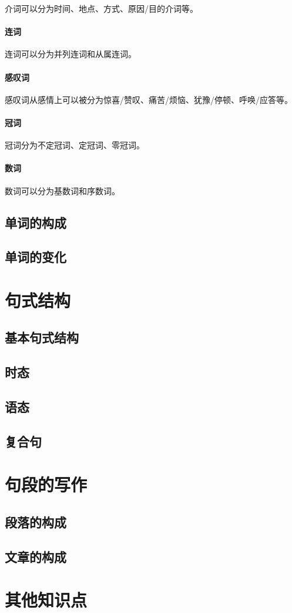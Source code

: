 \documentclass[UTF8]{ctexbook}
\begin{document}
介词可以分为时间、地点、方式、原因/目的介词等。

\subsection{连词}

连词可以分为并列连词和从属连词。

\subsection{感叹词}

感叹词从感情上可以被分为惊喜/赞叹、痛苦/烦恼、犹豫/停顿、呼唤/应答等。

\subsection{冠词}

冠词分为不定冠词、定冠词、零冠词。

\subsection{数词}

数词可以分为基数词和序数词。


\chapter{单词的构成}

\chapter{单词的变化}

\part{句式结构}

\chapter{基本句式结构}

\chapter{时态}

\chapter{语态}

\chapter{复合句}

\part{句段的写作}

\chapter{段落的构成}

\chapter{文章的构成}

\part{其他知识点}
\end{document}
